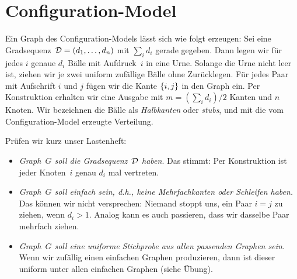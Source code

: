 \section{Configuration-Model}
Ein Graph des Configuration-Models lässt sich wie folgt erzeugen:
Sei eine Gradsequenz~$\mathcal{D} = (d_1, \ldots, d_n)$ mit $\sum_i d_i$ gerade gegeben.
Dann legen wir für jedes $i$ genaue $d_i$ Bälle mit Aufdruck~$i$ in eine Urne.
Solange die Urne nicht leer ist, ziehen wir je zwei uniform zufällige Bälle ohne Zurücklegen.
Für jedes Paar mit Aufschrift $i$ und $j$ fügen wir die Kante $\left\{i, j\right\}$ in den Graph ein.
Per Konstruktion erhalten wir eine Ausgabe mit $m = (\sum_i d_i) / 2$ Kanten und $n$ Knoten.
Wir bezeichnen die Bälle als \emph{Halbkanten} oder \emph{stubs}, und mit \CMd die vom Configuration-Model erzeugte Verteilung.

\medskip

\noindent
Prüfen wir kurz unser Lastenheft:
\begin{itemize}
    \item \emph{Graph~$G$ soll die Gradsequenz~$\mathcal{D}$ haben}.
          Das stimmt: Per Konstruktion ist jeder Knoten~$i$ genau $d_i$ mal vertreten.

    \item \emph{Graph~$G$ soll einfach sein, d.h., keine Mehrfachkanten oder Schleifen haben.}
          Das können wir nicht versprechen: Niemand stoppt uns, ein Paar $i = j$ zu ziehen, wenn $d_i > 1$.
          Analog kann es auch passieren, dass wir dasselbe Paar mehrfach ziehen.

    \item \emph{Graph~$G$ soll eine uniforme Stichprobe aus allen passenden Graphen sein.}
          Wenn wir zufällig einen einfachen Graphen produzieren, dann ist dieser uniform unter allen einfachen Graphen (siehe Übung).
\end{itemize}


